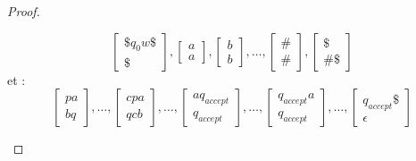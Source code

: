 \documentclass{cours}
\begin{document}
\begin{proof}
\begin{enumerate}
        \[
            \left[\begin{array}{c}
                \$q_{0}w\$ \\ \$
            \end{array}\right], \left[\begin{array}{c}
                a \\ a
            \end{array}\right], \left[\begin{array}{c}
                b \\ b
            \end{array}\right], \ldots, \left[\begin{array}{c}
                \# \\ \#
            \end{array}\right], \left[\begin{array}{c}
                \$ \\ \#\$
            \end{array}\right]
        \]
        et :
        \[   
            \left[\begin{array}{c}
                pa \\ bq
            \end{array}\right], \ldots,
            \left[\begin{array}{c}
                cpa \\ qcb
            \end{array}\right], \ldots, 
            \left[\begin{array}{c}
                aq_{accept} \\ q_{accept}
            \end{array}\right], \ldots,
            \left[\begin{array}{c}
                q_{accept}a\\ q_{accept}
            \end{array}\right], \ldots,
            \left[\begin{array}{c}
                q_{accept}\$ \\ \epsilon
            \end{array}\right]
        \]
    \end{enumerate}
\end{proof}
\end{document}
